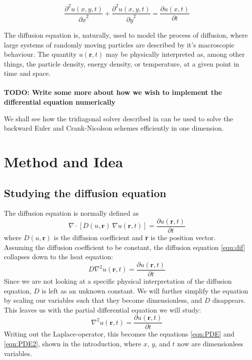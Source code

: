 \documentclass[10pt,a4paper]{article}
\newcommand{\pt}{{\partial t}}
\newcommand{\px}{{\partial x}}
\newcommand{\py}{{\partial y}}
\newcommand{\pu}{{\partial u}}
\newcommand{\ppu}{{\partial^2 u}}
\begin{document}
\begin{equation}\label{eqn:PDE2}
\frac{\ppu(x,y,t)}{\px^2} + \frac{\ppu(x,y,t)}{\py^2} = \frac{\pu(x,t)}{\pt}
\end{equation}


The diffusion equation is, naturally, used to model the process of diffusion, where large systems of randomly moving particles are described by it's macroscopic behaviour. The quantity $u(\textbf{r},t)$ may be physically interpreted as, among other things, the particle density, energy density, or temperature, at a given point in time and space.
\\\\
\textbf{TODO: Write some more about how we wish to implement the differential equation numerically}



We shall see how the tridiagonal solver described in \cite{hustad_lunde_project1} can be used to solve the backward Euler and Crank-Nicolson schemes efficiently in one dimension.

\section{Method and Idea}

\subsection{Studying the diffusion equation}\label{sec:dif}

The diffusion equation is normally defined as
\begin{equation}\label{eqn:dif}
\nabla \cdot \left[D(u,\textbf{r}) \ \nabla u(\textbf{r},t)\right] = \frac{\pu(\textbf{r},t)}{\pt}
\end{equation}
where $D(u,\textbf{r})$ is the diffusion coefficient and \textbf{r} is the position vector.
\\
Assuming the diffusion coefficient to be constant, the diffusion equation \vref{eqn:dif} collapses down to the heat equation:
\begin{equation}
D \nabla^2 u(\textbf{r},t) = \frac{\pu(\textbf{r},t)}{\pt}
\end{equation}
Since we are not looking at a specific physical interpretation of the diffusion equation, $D$ is left as an unknown constant. We will further simplify the equation by scaling our variables such that they become dimensionless, and $D$ disappears. This leaves us with the partial differential equation we will study:
\begin{equation}\label{eq:dif_simple}
\nabla^2 u(\textbf{r},t) = \frac{\pu(\textbf{r},t)}{\pt}
\end{equation}
Writing out the Laplace-operator, this becomes the equations \ref{eqn:PDE} and \ref{eqn:PDE2}, shown in the introduction, where $x$, $y$, and $t$ now are dimensionless variables.
\end{document}
